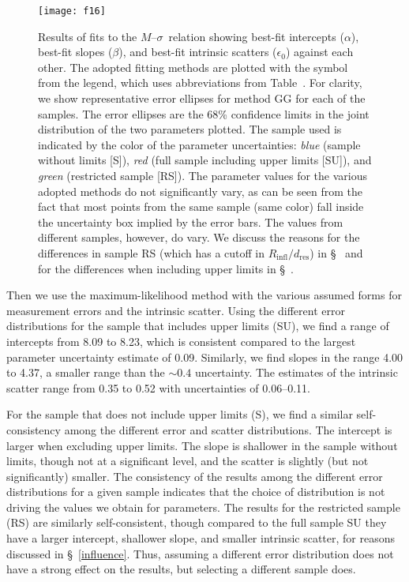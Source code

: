 \documentclass[twosided,letterpaper,numberedappendix]{emulateapj}
\newcommand{\msigma}   {\ensuremath{M}{--}\ensuremath{\sigma}}
\newcommand{\rinfres} {\ensuremath{R_{\mathrm{infl}} / d_{\mathrm{res}}}}
\begin{document}
%

\begin{figure*}
\texttt{[image: f16]}
\caption{Results of fits to the \msigma\ relation showing best-fit
intercepts ($\alpha$), best-fit slopes ($\beta$), and best-fit
intrinsic scatters ($\epsilon_0$) against each other. The adopted
fitting methods are plotted with the symbol from the legend, which
uses abbreviations from Table~\protect{\ref{t:abbrev}}.  For clarity,
we show representative error ellipses for method GG for each of the
samples.  The error ellipses are the 68\% confidence limits in the
joint distribution of the two parameters plotted.  The sample used is
indicated by the color of the parameter uncertainties: \emph{blue}
(sample without limits [S]), \emph{red} (full sample including upper
limits [SU]), and \emph{green} (restricted sample [RS]).  The
parameter values for the various adopted methods do not significantly
vary, as can be seen from the fact that most points from the same
sample (same color) fall inside the uncertainty box implied by the
error bars.  The values from different samples, however, do vary.  We
discuss the reasons for the differences in sample RS (which has a
cutoff in \rinfres) in \S~\protect{\ref{influence}} and for the
differences when including upper limits in
\S~\protect{\ref{upperlimits}}.}
\label{f:allfits}
\end{figure*}


Then we use the maximum-likelihood method with the various assumed
forms for measurement errors and the intrinsic scatter.  Using the
different error distributions for the sample that includes upper
limits (SU), we find a range of intercepts from 8.09 to 8.23, which
is consistent compared to the largest parameter uncertainty estimate 
of 0.09.  Similarly, we find slopes in the range 4.00 to 4.37, a
smaller range than the $\sim 0.4$ uncertainty.  The estimates of the
intrinsic scatter range from 0.35 to 0.52 with uncertainties of
0.06--0.11.

For the sample that does not include upper limits (S), we find a
similar self-consistency among the different error and scatter
distributions.  The intercept is larger when excluding upper limits.
The slope is shallower in the sample without limits, though not at a
significant level, and the scatter is slightly (but not significantly)
smaller.  The consistency of the results among the different error
distributions for a given sample indicates that the choice of
distribution is not driving the values we obtain for parameters.  The
results for the restricted sample (RS) are similarly self-consistent,
though compared to the full sample SU they have a larger intercept,
shallower slope, and smaller intrinsic scatter, for reasons
discussed in \S~\ref{influence}.  Thus, assuming a different error
distribution does not have a strong effect on the results, but
selecting a different sample does.
\end{document}
